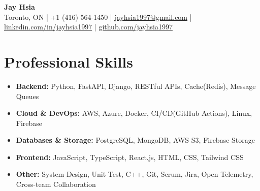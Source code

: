 \documentclass[letterpaper,12pt]{article}
\let\hrefWithoutArrow\href
\renewcommand{\href}[2]{
  \hrefWithoutArrow{#1}{
    \ifthenelse{\equal{#2}{}}{ }{#2\ }
    \raisebox{.15ex}{\footnotesize \faExternalLink*}
  }
}
\newcommand{\resumeItemNH}[1]{
  \item\small{
    {#1 \vspace{-2pt}}
  }
}
\newcommand{\resumeItemListStart}{\begin{itemize}[leftmargin=*]}
\newcommand{\resumeItemListEnd}{\end{itemize}}
\begin{document}
\begin{center}
{\LARGE \textbf{Jay Hsia}}\\[0.25em]
\small Toronto, ON | +1 (416) 564-1450 |
\hrefWithoutArrow{mailto:jayhsia1997@gmail.com}{jayhsia1997@gmail.com} |
\hrefWithoutArrow{https://www.linkedin.com/in/jayhsia1997/}{linkedin.com/in/jayhsia1997} |
\hrefWithoutArrow{https://github.com/jayhsia1997}{github.com/jayhsia1997}
\\[0.4em]
\end{center}


\section*{Professional Skills}
  \resumeItemListStart
    \resumeItemNH{\textbf{Backend:} Python, FastAPI, Django, RESTful APIs, Cache(Redis), Message Queues}
    \resumeItemNH{\textbf{Cloud \& DevOps:} AWS, Azure, Docker, CI/CD(GitHub Actions), Linux, Firebase}
    \resumeItemNH{\textbf{Databases \& Storage:} PostgreSQL, MongoDB, AWS S3, Firebase Storage}
    \resumeItemNH{\textbf{Frontend:} JavaScript, TypeScript, React.js, HTML, CSS, Tailwind CSS}
    \resumeItemNH{\textbf{Other:} System Design, Unit Test, C++, Git, Scrum, Jira, Open Telemetry, Cross-team Collaboration}
  \resumeItemListEnd

\end{document}
